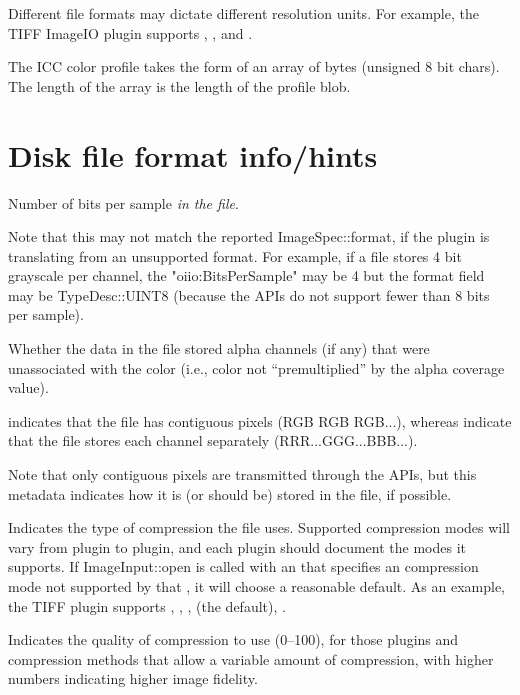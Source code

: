 Different file formats may dictate different resolution units.
For example, the TIFF ImageIO plugin supports , , 
and .
\apiend

\NEW %
The ICC color profile takes the form of an array of bytes (unsigned 8 bit
chars). The length of the array is the length of the profile blob.
\apiend

\section{Disk file format info/hints}

Number of bits per sample \emph{in the file}.  

Note that this may not match the reported {\cf ImageSpec::format}, if
the plugin is translating from an unsupported format.  For example, if a
file stores 4 bit grayscale per channel, the {\cf "oiio:BitsPerSample"} may
be 4 but the {\cf format} field may be {\cf TypeDesc::UINT8} (because
the \product APIs do not support fewer than 8 bits per sample).
\apiend

Whether the data in the file stored alpha channels (if any) that were
unassociated with the color (i.e., color not ``premultiplied'' by the
alpha coverage value).
\apiend

 indicates that the file has contiguous pixels (RGB RGB
RGB...), whereas  indicate that the file stores each
channel separately (RRR...GGG...BBB...).

Note that only contiguous pixels are transmitted through the \product
APIs, but this metadata indicates how it is (or should be) stored in the
file, if possible.
\apiend

Indicates the type of compression the file uses.  Supported compression
modes will vary from \ImageInput plugin to plugin, and each plugin
should document the modes it supports.  If {\cf ImageInput::open} is
called with an \ImageSpec that specifies an compression mode not
supported by that \ImageInput, it will choose a reasonable default.
As an example, the TIFF \ImageInput plugin supports ,
, ,  (the default), .
\apiend

Indicates the quality of compression to use (0--100), for those 
plugins and compression methods that allow a variable amount of 
compression, with higher numbers indicating higher image fidelity.
\apiend

